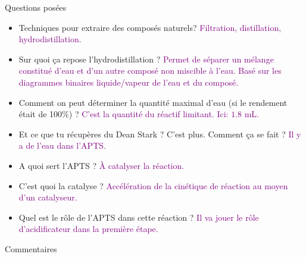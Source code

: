 \begin{reportBlock}{Questions posées}
\begin{itemize}
\item Techniques pour extraire des composés naturels? \textcolor{purple}{Filtration, distillation, hydrodistillation.}



\item Sur quoi ça repose l'hydrodistillation ? \textcolor{purple}{Permet de séparer un mélange constitué d'eau et d'un autre composé non miscible à l'eau. Basé sur les diagrammes binaires liquide/vapeur de l'eau et du composé.}



\item Comment on peut déterminer la quantité maximal d'eau (si le rendement était de 100\%) ? \textcolor{purple}{C'est la quantité du réactif limitant. Ici: $1.8$ mL.}


\item Et ce que tu récupères du Dean Stark ? C'est plus. Comment ça se fait ? \textcolor{purple}{Il y a de l'eau dans l'APTS.}


\item A quoi sert l'APTS ? \textcolor{purple}{À catalyser la réaction.}


\item C'est quoi la catalyse ? \textcolor{purple}{Accélération de la cinétique de réaction au moyen d'un catalyseur.}


\item Quel est le rôle de l'APTS dans cette réaction ? \textcolor{purple}{Il va jouer le rôle d'acidificateur dans la première étape.}


\end{itemize}


\end{reportBlock}

\begin{reportBlock}{Commentaires}



\end{reportBlock}


